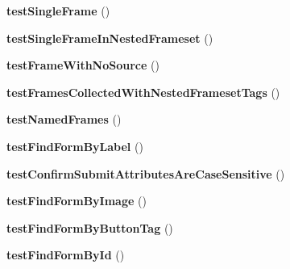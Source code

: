 \begin{DoxyCompactItemize}
\item 
\hypertarget{class_test_of_page_scraping_a56088bdf9cc44cf1134919812fd93221}{
{\bfseries testSingleFrame} ()}
\label{class_test_of_page_scraping_a56088bdf9cc44cf1134919812fd93221}

\item 
\hypertarget{class_test_of_page_scraping_adc67c332e7625bf08e688591bdb7c02f}{
{\bfseries testSingleFrameInNestedFrameset} ()}
\label{class_test_of_page_scraping_adc67c332e7625bf08e688591bdb7c02f}

\item 
\hypertarget{class_test_of_page_scraping_a4cbb4165283d7f1eef77612fda11059e}{
{\bfseries testFrameWithNoSource} ()}
\label{class_test_of_page_scraping_a4cbb4165283d7f1eef77612fda11059e}

\item 
\hypertarget{class_test_of_page_scraping_a64bdb7ca8d6e31a611e05d61fd54549c}{
{\bfseries testFramesCollectedWithNestedFramesetTags} ()}
\label{class_test_of_page_scraping_a64bdb7ca8d6e31a611e05d61fd54549c}

\item 
\hypertarget{class_test_of_page_scraping_a4169a3dfc6510fd53648e57b9860f88a}{
{\bfseries testNamedFrames} ()}
\label{class_test_of_page_scraping_a4169a3dfc6510fd53648e57b9860f88a}

\item 
\hypertarget{class_test_of_page_scraping_a8dfdd42c914e79418dce7713264d221c}{
{\bfseries testFindFormByLabel} ()}
\label{class_test_of_page_scraping_a8dfdd42c914e79418dce7713264d221c}

\item 
\hypertarget{class_test_of_page_scraping_a401254588ad791258c2cec35d5b83a0b}{
{\bfseries testConfirmSubmitAttributesAreCaseSensitive} ()}
\label{class_test_of_page_scraping_a401254588ad791258c2cec35d5b83a0b}

\item 
\hypertarget{class_test_of_page_scraping_af77383e87b73e681a8080da5d48a421d}{
{\bfseries testFindFormByImage} ()}
\label{class_test_of_page_scraping_af77383e87b73e681a8080da5d48a421d}

\item 
\hypertarget{class_test_of_page_scraping_afc3d9d5f182b8f7e42a0fb9ecce71706}{
{\bfseries testFindFormByButtonTag} ()}
\label{class_test_of_page_scraping_afc3d9d5f182b8f7e42a0fb9ecce71706}

\item 
\hypertarget{class_test_of_page_scraping_a4293f67c7f7170a4e00bcc016a94eae5}{
{\bfseries testFindFormById} ()}
\label{class_test_of_page_scraping_a4293f67c7f7170a4e00bcc016a94eae5}


\end{DoxyCompactItemize}
